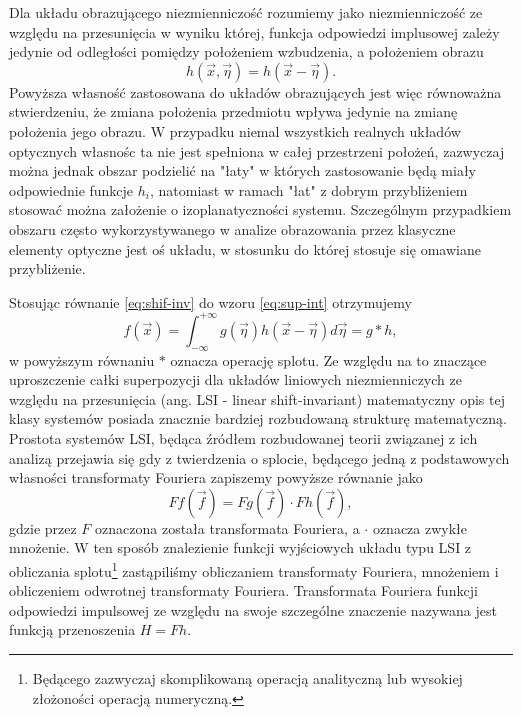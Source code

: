 Dla układu obrazującego niezmienniczość rozumiemy jako niezmienniczość ze względu na przesunięcia w wyniku której, funkcja odpowiedzi implusowej zależy jedynie od odległości pomiędzy położeniem wzbudzenia, a położeniem obrazu
\begin{equation}
h(\vec{x},\vec{\eta})=h(\vec{x}-\vec{\eta}).
\label{eq:shif-inv}
\end{equation}
Powyższa własność zastosowana do układów obrazujących jest więc równoważna stwierdzeniu, że zmiana położenia przedmiotu wpływa jedynie na zmianę położenia jego obrazu. W przypadku niemal wszystkich realnych układów optycznych własnośc ta nie jest spełniona w całej przestrzeni położeń, zazwyczaj można jednak obszar podzielić na "łaty" w których zastosowanie będą miały odpowiednie funkcje $h_i$, natomiast w ramach "łat" z dobrym przybliżeniem stosować można założenie o izoplanatyczności systemu. Szczególnym przypadkiem obszaru często wykorzystywanego w analize obrazowania przez klasyczne elementy optyczne jest oś układu, w stosunku do której stosuje się omawiane przybliżenie.

Stosując równanie \ref{eq:shif-inv} do wzoru \ref{eq:sup-int} otrzymujemy
\begin{equation}
f(\vec{x})=\int_{-\infty}^{+\infty} g(\vec{\eta})  h(\vec{x}-\vec{\eta}) d \vec{\eta} = g \ast h,
\label{eq:splot}
\end{equation}
w powyższym równaniu $\ast$ oznacza operację splotu. Ze względu na to znaczące uproszczenie całki superpozycji dla układów liniowych niezmienniczych ze względu na przesunięcia (ang. LSI - linear shift-invariant) matematyczny opis tej klasy systemów posiada znacznie bardziej rozbudowaną strukturę matematyczną. Prostota systemów LSI, będąca źródłem rozbudowanej teorii związanej z ich analizą przejawia się gdy z twierdzenia o splocie, będącego jedną z podstawowych własności transformaty Fouriera zapiszemy powyższe równanie jako
\begin{equation}
F{f}(\vec{f}) = F{g}(\vec{f}) \cdot F{h}(\vec{f}),
\label{eq:transfer-mult}
\end{equation}
gdzie przez $F$ oznaczona została transformata Fouriera, a $\cdot$ oznacza zwykłe mnożenie. W ten sposób znalezienie funkcji wyjściowych układu typu LSI z obliczania splotu\footnote{Będącego zazwyczaj skomplikowaną operacją analityczną lub wysokiej złożoności operacją numeryczną.} zastąpiliśmy obliczaniem transformaty Fouriera, mnożeniem i obliczeniem odwrotnej transformaty Fouriera. Transformata Fouriera funkcji odpowiedzi impulsowej ze względu na swoje szczególne znaczenie nazywana jest funkcją przenoszenia $H=F{h}$.

